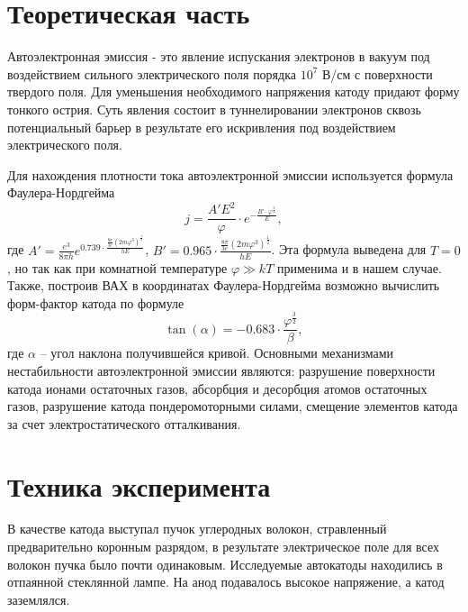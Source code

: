 \documentclass[a4paper, 12pt]{article}
\begin{document}
	\section{Теоретическая часть}
	Автоэлектронная эмиссия - это явление испускания электронов в вакуум под воздействием сильного электрического поля порядка $10^7$ В/см с поверхности твердого поля. Для уменьшения необходимого напряжения катоду придают форму тонкого острия. Суть явления состоит в туннелировании электронов сквозь потенциальный барьер в результате его искривления под воздействием электрического поля.\par
	Для нахождения плотности тока автоэлектронной эмиссии используется формула Фаулера-Нордгейма
	\begin{equation}
		j=\frac{A'E^2}{\varphi}\cdot e^{-\frac{B'\cdot \varphi^{\frac{3}{2}}}{E}},	
	\end{equation}
	где $A'=\frac{e^3}{8\pi h}e^{0.739\cdot\frac{\frac{8\pi}{3e}\left(2m\varphi^3\right)^{\frac{1}{2}}}{hE}}$, $B'=0.965\cdot\frac{\frac{8\pi}{3e}\left(2m\varphi^3\right)^{\frac{1}{2}}}{hE}$. Эта формула выведена для $T=0$, но так как при комнатной температуре $\varphi\gg kT$ применима и в нашем случае. Также, построив ВАХ в координатах Фаулера-Нордгейма возможно вычислить форм-фактор катода по формуле
	\begin{equation}
		\tan(\alpha)=-0.683\cdot\frac{\varphi^{\frac{3}{2}}}{\beta},
	\end{equation}
	где $\alpha$ -- угол наклона получившейся кривой. Основными механизмами нестабильности автоэлектронной эмиссии являются: разрушение поверхности катода ионами остаточных газов, абсорбция и десорбция атомов остаточных газов, разрушение катода пондеромоторными силами, смещение элементов катода за счет электростатического отталкивания.
	\section{Техника эксперимента}
	В качестве катода выступал пучок углеродных волокон, стравленный предварительно коронным разрядом, в результате электрическое поле для всех волокон пучка было почти одинаковым. Исследуемые автокатоды находились в отпаянной стеклянной лампе. На анод подавалось высокое напряжение, а катод заземлялся.
	\newpage
\end{document}
